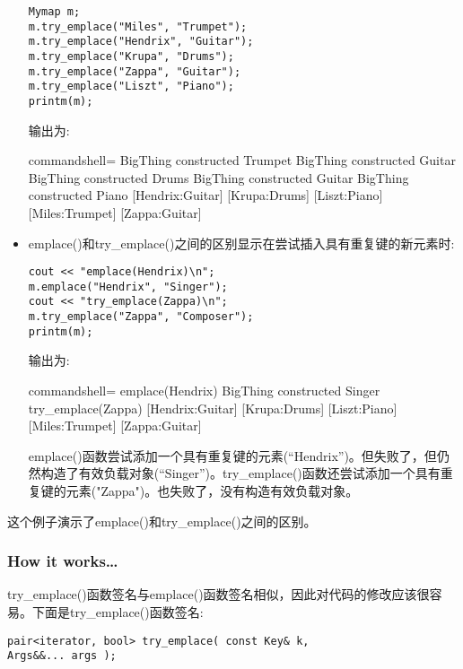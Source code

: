 \begin{itemize}
\begin{lstlisting}[style=styleCXX]
Mymap m;
m.try_emplace("Miles", "Trumpet");
m.try_emplace("Hendrix", "Guitar");
m.try_emplace("Krupa", "Drums");
m.try_emplace("Zappa", "Guitar");
m.try_emplace("Liszt", "Piano");
printm(m);
\end{lstlisting}

输出为:

\begin{tcblisting}{commandshell={}}
BigThing constructed Trumpet
BigThing constructed Guitar
BigThing constructed Drums
BigThing constructed Guitar
BigThing constructed Piano
[Hendrix:Guitar] [Krupa:Drums] [Liszt:Piano]
[Miles:Trumpet] [Zappa:Guitar]
\end{tcblisting}

\item 
emplace()和try\_emplace()之间的区别显示在尝试插入具有重复键的新元素时:

\begin{lstlisting}[style=styleCXX]
cout << "emplace(Hendrix)\n";
m.emplace("Hendrix", "Singer");
cout << "try_emplace(Zappa)\n";
m.try_emplace("Zappa", "Composer");
printm(m);
\end{lstlisting}

输出为:

\begin{tcblisting}{commandshell={}}
emplace(Hendrix)
BigThing constructed Singer
try_emplace(Zappa)
[Hendrix:Guitar] [Krupa:Drums] [Liszt:Piano]
[Miles:Trumpet] [Zappa:Guitar]
\end{tcblisting}

emplace()函数尝试添加一个具有重复键的元素(“Hendrix”)。但失败了，但仍然构造了有效负载对象(“Singer”)。try\_emplace()函数还尝试添加一个具有重复键的元素("Zappa")。也失败了，没有构造有效负载对象。
\end{itemize}

这个例子演示了emplace()和try\_emplace()之间的区别。

\subsubsection{How it works…}

try\_emplace()函数签名与emplace()函数签名相似，因此对代码的修改应该很容易。下面是try\_emplace()函数签名:

\begin{lstlisting}[style=styleCXX]
pair<iterator, bool> try_emplace( const Key& k,
Args&&... args );
\end{lstlisting}

